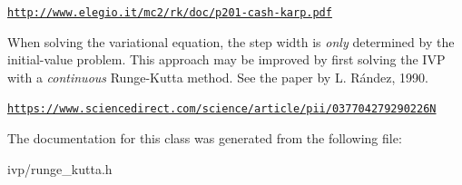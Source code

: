 \href{http://www.elegio.it/mc2/rk/doc/p201-cash-karp.pdf}{\tt http\+://www.\+elegio.\+it/mc2/rk/doc/p201-\/cash-\/karp.\+pdf}

When solving the variational equation, the step width is {\itshape only} determined by the initial-\/value problem. This approach may be improved by first solving the I\+VP with a {\itshape continuous} Runge-\/\+Kutta method. See the paper by L. Rández, 1990.

\href{https://www.sciencedirect.com/science/article/pii/037704279290226N}{\tt https\+://www.\+sciencedirect.\+com/science/article/pii/037704279290226N} 

The documentation for this class was generated from the following file\+:\begin{DoxyCompactItemize}
\item 
ivp/runge\+\_\+kutta.\+h\end{DoxyCompactItemize}

